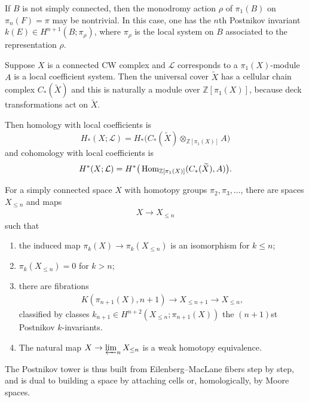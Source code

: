 \documentclass[12pt]{article}
\begin{document}
If $B$ is not simply connected, then the monodromy action $\rho$ of $\pi_1(B)$ on $\pi_n(F) = \pi$ may be nontrivial. In this case, one has the $n$th Postnikov invariant $k(E) \in H^{n+1}(B;\pi_\rho)$, where $\pi_\rho$ is the local system on $B$ associated to the representation $\rho$.

\begin{remark}
    Suppose $X$ is a connected CW complex and $\mathcal L$ corresponds to a $\pi_1(X)$-module $A$ is a local coefficient system. Then the universal cover $\widetilde X$ has a cellular chain complex $C_*(\widetilde X)$
and this is naturally a module over $\mathbb Z[\pi_1(X)]$, because deck transformations act on $\widetilde X$.

Then homology with local coefficients is
\[H_*(X;\mathcal L)=H_*\big(C_*(\widetilde X)\otimes_{\mathbb Z[\pi_1(X)]} A\big)\] and cohomology with local coefficients is
\[
H^*(X;\mathcal L)=H^*\big(\operatorname{Hom}_{\mathbb Z[\pi_1(X)]}(C_*(\widetilde X),A)\big).
\]

\end{remark}

\begin{theorem}
For a simply connected space $X$ with homotopy groups $\pi_2,\pi_3,\dots$, there are spaces $X_{\le n}$ and maps
\begin{align*}
    X \to X_{\le n}
\end{align*}
such that
\begin{enumerate}
    \item the induced map $\pi_k(X) \to \pi_k(X_{\le n})$
    is an isomorphism for $k \le n$;
    \item $\pi_k(X_{\le n}) = 0$ for $k > n$;
    \item there are fibrations
    \begin{align*}
        K(\pi_{n+1}(X),n+1) \to X_{\le n+1} \to X_{\le n},
    \end{align*}
    classified by classes $k_{n+1} \in H^{n+2}(X_{\le n};\pi_{n+1}(X))$
    the $(n+1)$st Postnikov $k$-invariants.
    \item The natural map $X \to \varprojlim_n X_{\le n}$
is a weak homotopy equivalence.
\end{enumerate}
\end{theorem}



The Postnikov tower is thus built from Eilenberg--MacLane fibers step by step, and is dual to building a space by attaching cells or, homologically, by Moore spaces.
\end{document}
